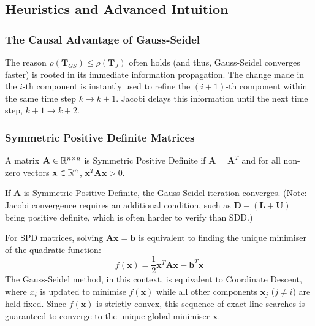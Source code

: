\subsection{Heuristics and Advanced Intuition}

\subsubsection{The Causal Advantage of Gauss-Seidel}

The reason $\rho(\mathbf{T}_{GS}) \le \rho(\mathbf{T}_J)$ often holds (and thus, Gauss-Seidel converges faster) is rooted in its immediate information propagation. The change made in the $i$-th component is instantly used to refine the $(i+1)$-th component within the same time step $k \to k+1$. Jacobi delays this information until the next time step, $k+1 \to k+2$.

\subsubsection{Symmetric Positive Definite Matrices}

\begin{definition}
A matrix $\mathbf{A} \in \mathbb{R}^{n \times n}$ is Symmetric Positive Definite if $\mathbf{A} = \mathbf{A}^T$ and for all non-zero vectors $\mathbf{x} \in \mathbb{R}^n$, $\mathbf{x}^T \mathbf{A} \mathbf{x} > 0$.
\end{definition}

\begin{theorem}
If $\mathbf{A}$ is Symmetric Positive Definite, the Gauss-Seidel iteration converges. (Note: Jacobi convergence requires an additional condition, such as $\mathbf{D} - (\mathbf{L}+\mathbf{U})$ being positive definite, which is often harder to verify than SDD.)
\end{theorem}
\begin{remark}
For SPD matrices, solving $\mathbf{A}\mathbf{x} = \mathbf{b}$ is equivalent to finding the unique minimiser of the quadratic function:
\[ f(\mathbf{x}) = \frac{1}{2}\mathbf{x}^T \mathbf{A} \mathbf{x} - \mathbf{b}^T \mathbf{x} \]
The Gauss-Seidel method, in this context, is equivalent to Coordinate Descent, where $x_i$ is updated to minimise $f(\mathbf{x})$ while all other components $\mathbf{x}_j$ ($j \ne i$) are held fixed. Since $f(\mathbf{x})$ is strictly convex, this sequence of exact line searches is guaranteed to converge to the unique global minimiser $\mathbf{x}$.
\end{remark}

